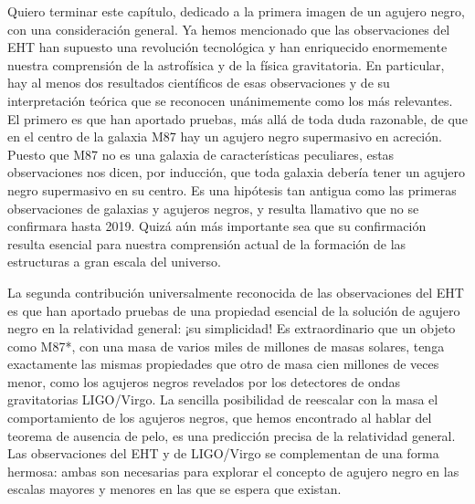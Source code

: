 Quiero terminar este capítulo, dedicado a la primera imagen de un agujero negro, con una consideración general. Ya hemos mencionado que las observaciones del EHT han supuesto una revolución tecnológica y han enriquecido enormemente nuestra comprensión de la astrofísica y de la física gravitatoria. En particular, hay al menos dos resultados científicos de esas observaciones y de su interpretación teórica que se reconocen unánimemente como los más relevantes. El primero es que han aportado pruebas, más allá de toda duda razonable, de que en el centro de la galaxia M87 hay un agujero negro supermasivo en acreción. Puesto que M87 no es una galaxia de características peculiares, estas observaciones nos dicen, por inducción, que toda galaxia debería tener un agujero negro supermasivo en su centro. Es una hipótesis tan antigua como las primeras observaciones de galaxias y agujeros negros, y resulta llamativo que no se confirmara hasta 2019. Quizá aún más importante sea que su confirmación resulta esencial para nuestra comprensión actual de la formación de las estructuras a gran escala del universo.

La segunda contribución universalmente reconocida de las observaciones del EHT es que han aportado pruebas de una propiedad esencial de la solución de agujero negro en la relatividad general: ¡su simplicidad! Es extraordinario que un objeto como M87*, con una masa de varios miles de millones de masas solares, tenga exactamente las mismas propiedades que otro de masa cien millones de veces menor, como los agujeros negros revelados por los detectores de ondas gravitatorias LIGO/Virgo. La sencilla posibilidad de reescalar con la masa el comportamiento de los agujeros negros, que hemos encontrado al hablar del teorema de ausencia de pelo, es una predicción precisa de la relatividad general. Las observaciones del EHT y de LIGO/Virgo se complementan de una forma hermosa: ambas son necesarias para explorar el concepto de agujero negro en las escalas mayores y menores en las que se espera que existan.

